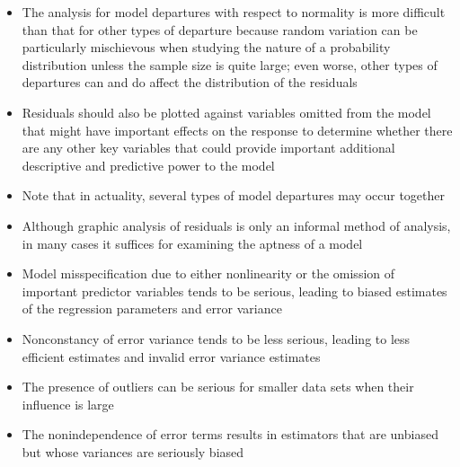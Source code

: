\begin{itemize}
\item The analysis for model departures with respect to normality is more difficult than that for other types of departure because random variation can be particularly mischievous when studying the nature of a probability distribution unless the sample size is quite large; even worse, other types of departures can and do affect the distribution of the residuals 
\item Residuals should also be plotted against variables omitted from the model that might have important effects on the response to determine whether there are any other key variables that could provide important additional descriptive and predictive power to the model 
\item Note that in actuality, several types of model departures may occur together 
\item Although graphic analysis of residuals is only an informal method of analysis, in many cases it suffices for examining the aptness of a model 
\item Model misspecification due to either nonlinearity or the omission of important predictor variables tends to be serious, leading to biased estimates of the regression parameters and error variance 
\item Nonconstancy of error variance tends to be less serious, leading to less efficient estimates and invalid error variance estimates 
\item The presence of outliers can be serious for smaller data sets when their influence is large 
\item The nonindependence of error terms results in estimators that are unbiased but whose variances are seriously biased 
\end{itemize} 

